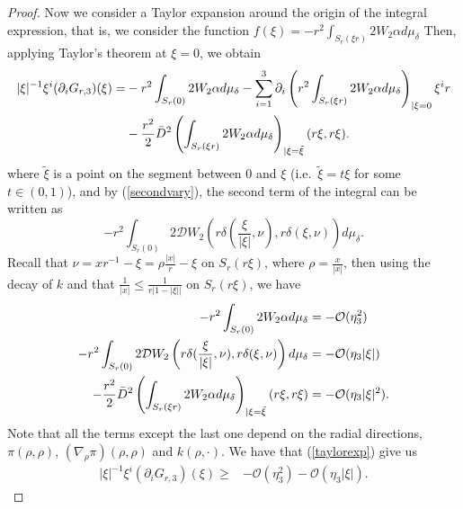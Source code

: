 \documentclass[12pt,a4paper]{amsart}
\theoremstyle{plain}
\theoremstyle{definition}
\begin{document}
\begin{proof}
Now we consider a Taylor expansion around the origin of the integral expression, that is, we consider the function $f(\xi)=-r^2 \int_{S_{r}(\xi r)}  2 W_2 \alpha d\mu_\delta $ Then, applying Taylor’s theorem at $\xi=0$, we obtain
\begin{equation}\label{taylorexp}
\begin{split}
  |\xi|^{-1} \xi^i (\partial_i G_{r,3})(\xi) =& -r^2 \int_{S_{r}(0)}   2 W_2 \alpha d\mu_\delta- \sum_{i=1}^{3} \partial_i \left( r^2\int_{S_{r}(\xi r)}  2 W_2 \alpha d\mu_\delta\right)_{|\xi=0} \xi^i r \\
 &- \frac{r^2}{2} \Bar{D}^2 \left(\int_{S_{r}(\xi r)}  2 W_2 \alpha d\mu_\delta\right)_{|\xi = \Tilde{\xi}}(r \xi, r \xi).\\
 \end{split}
\end{equation}
where $\tilde{\xi}$ is a point on the segment between $0$ and $\xi$ (i.e.\ $\tilde{\xi}=t\xi$ for some $t\in(0,1)$), and by (\ref{secondvary}), the second term of the integral can be written as 
\begin{equation}
     -  r^2\int_{S_{r}(0)}   2 \mathcal{D}W_2\left(r \delta( \frac{\xi}{|\xi|}, \nu ), r \delta( \xi, \nu ) \right) d\mu_\delta .
\end{equation}
Recall that $\nu= x r^{-1}- \xi = \rho \frac{|x|}{r}- \xi$ on $S_r(r \xi)$, where $\rho= \frac{x}{|x|}$, then using the decay of $k$  and that  $\frac{1}{|x|} \leq \frac{1}{r|1-|\xi||}$ on $S_r(r \xi)$, we have 
\begin{equation}\label{estitaylor}
    \begin{split}
      -r^2 \int_{S_{r}(0)}   2 W_2 \alpha d\mu_\delta&=-  \mathcal{O}(\eta_3^2) \\
      -  r^2\int_{S_{r}(0)}   2 \mathcal{D}W_2\left(r \delta( \frac{\xi}{|\xi|}, \nu ), r \delta( \xi, \nu ) \right) d\mu_\delta &= -  \mathcal{O}(\eta_3 |\xi|)\\
      - \frac{r^2}{2} \Bar{D}^2 \left(\int_{S_{r}(\xi r)}  2 W_2 \alpha d\mu_\delta\right)_{|\xi = \Tilde{\xi}}(r \xi, r \xi)&= -  \mathcal{O}(\eta_3 |\xi|^2).
    \end{split}
\end{equation}
 Note that all the terms except the last one depend on the radial directions,  $\pi(\rho,\rho)$, $(\nabla_\rho \pi)(\rho,\rho)$ and $k(\rho,\cdot) $. We have that (\ref{taylorexp}) give us 
\begin{equation}\label{varG3}
\begin{split}
    |\xi|^{-1} \xi^i (\partial_i G_{r,3})(\xi) \geq& -\mathcal{O}(\eta_3^2) -\mathcal{O}(\eta_3 |\xi|). 

\end{split}
\end{equation}
\end{proof}
\end{document}

